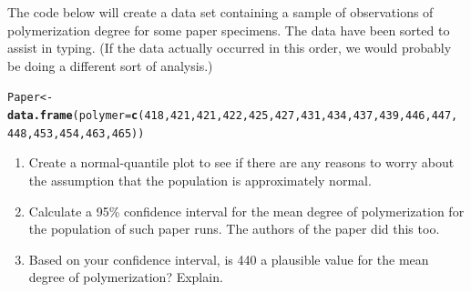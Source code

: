 \documentclass[twoside]{book}\usepackage[]{graphicx}\usepackage[]{xcolor}
\makeatletter
\newcommand{\hlnum}[1]{\textcolor[rgb]{0.686,0.059,0.569}{#1}}%
\newcommand{\hlstd}[1]{\textcolor[rgb]{0.345,0.345,0.345}{#1}}%
\newcommand{\hlkwb}[1]{\textcolor[rgb]{0.69,0.353,0.396}{#1}}%
\newcommand{\hlkwc}[1]{\textcolor[rgb]{0.333,0.667,0.333}{#1}}%
\newcommand{\hlkwd}[1]{\textcolor[rgb]{0.737,0.353,0.396}{\textbf{#1}}}%
\newenvironment{kframe}{%
 \def\at@end@of@kframe{}%
 \ifinner\ifhmode%
  \def\at@end@of@kframe{\end{minipage}}%
  \begin{minipage}{\columnwidth}%
 \fi\fi%
 \def\FrameCommand##1{\hskip\@totalleftmargin \hskip-\fboxsep
 \colorbox{shadecolor}{##1}\hskip-\fboxsep
     \hskip-\linewidth \hskip-\@totalleftmargin \hskip\columnwidth}%
 \MakeFramed {\advance\hsize-\width
   \@totalleftmargin\z@ \linewidth\hsize
   \@setminipage}}%
 {\par\unskip\endMakeFramed%
 \at@end@of@kframe}
\newenvironment{knitrout}{}{} %
\makeatother
\begin{document}
\begin{problem}
	The code below will create a data set containing a sample of observations
	of polymerization degree for some paper specimens.  The data have been 
	sorted to assist in typing.  (If the data actually occurred in this order,
	we would probably be doing a different sort of analysis.)
\begin{knitrout}
\color{fgcolor}\begin{kframe}
\begin{alltt}
\hlstd{Paper} \hlkwb{<-} \hlkwd{data.frame}\hlstd{(}\hlkwc{polymer} \hlstd{=} \hlkwd{c}\hlstd{(}\hlnum{418}\hlstd{,} \hlnum{421}\hlstd{,} \hlnum{421}\hlstd{,} \hlnum{422}\hlstd{,} \hlnum{425}\hlstd{,} \hlnum{427}\hlstd{,} \hlnum{431}\hlstd{,} \hlnum{434}\hlstd{,} \hlnum{437}\hlstd{,} \hlnum{439}\hlstd{,} \hlnum{446}\hlstd{,} \hlnum{447}\hlstd{,}
    \hlnum{448}\hlstd{,} \hlnum{453}\hlstd{,} \hlnum{454}\hlstd{,} \hlnum{463}\hlstd{,} \hlnum{465}\hlstd{))}
\end{alltt}
\end{kframe}
\end{knitrout}
	\begin{enumerate}
		\item Create a normal-quantile plot to see if there are any reasons
			to worry about the assumption that the population is approximately normal.
		\item
				Calculate 
				a 95\% confidence interval for the mean
				degree of polymerization for the population of such paper runs.
				The authors of the paper did this too.
		\item
			Based on your confidence interval, is 440 a plausible value
			for the mean degree of polymerization?  Explain.
	\end{enumerate}
\end{problem}
\end{document}
